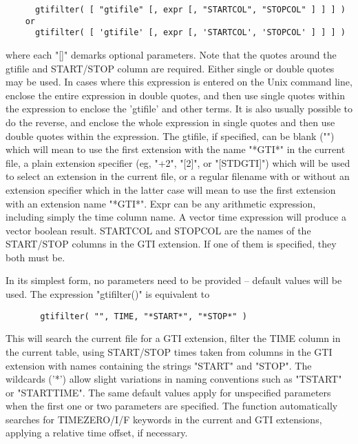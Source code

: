 \documentclass[11pt]{book}
\begin{document}
\begin{verbatim}
      gtifilter( [ "gtifile" [, expr [, "STARTCOL", "STOPCOL" ] ] ] )
    or
      gtifilter( [ 'gtifile' [, expr [, 'STARTCOL', 'STOPCOL' ] ] ] )
\end{verbatim}
    where  each "[]" demarks optional parameters.  Note that  the quotes
    around the gtifile and START/STOP column are required.  Either single
    or double quotes may be used.  In cases where this expression is
    entered on the Unix command line, enclose the entire expression in
    double quotes, and then use single quotes within the expression to
    enclose the 'gtifile' and other terms.  It is also usually possible
    to do the reverse, and enclose the whole expression in single quotes
    and then use double quotes within the expression.  The gtifile,
    if specified,  can be blank  ("") which will  mean to use  the first
    extension  with   the name "*GTI*"  in   the current  file,  a plain
    extension  specifier (eg, "+2",  "[2]", or "[STDGTI]") which will be
    used  to  select  an extension  in  the current  file, or  a regular
    filename with or without an extension  specifier which in the latter
    case  will mean to  use the first  extension  with an extension name
    "*GTI*".  Expr can be   any arithmetic expression, including  simply
    the time  column  name.  A  vector  time expression  will  produce a
    vector boolean  result.  STARTCOL and  STOPCOL are the  names of the
    START/STOP   columns in the    GTI extension.  If   one  of them  is
    specified, they both  must be.

    In  its  simplest form, no parameters need to be provided -- default
    values will be used.  The expression "gtifilter()" is equivalent to

\begin{verbatim}
       gtifilter( "", TIME, "*START*", "*STOP*" )
\end{verbatim}
    This will search the current file for a GTI  extension,  filter  the
    TIME  column in the current table, using START/STOP times taken from
    columns in the GTI  extension  with  names  containing  the  strings
    "START"  and "STOP".  The wildcards ('*') allow slight variations in
    naming conventions  such  as  "TSTART"  or  "STARTTIME".   The  same
    default  values  apply for unspecified parameters when the first one
    or  two  parameters  are  specified.   The  function   automatically
    searches   for   TIMEZERO/I/F   keywords  in  the  current  and  GTI
    extensions, applying a relative time offset, if necessary.
\end{document}

